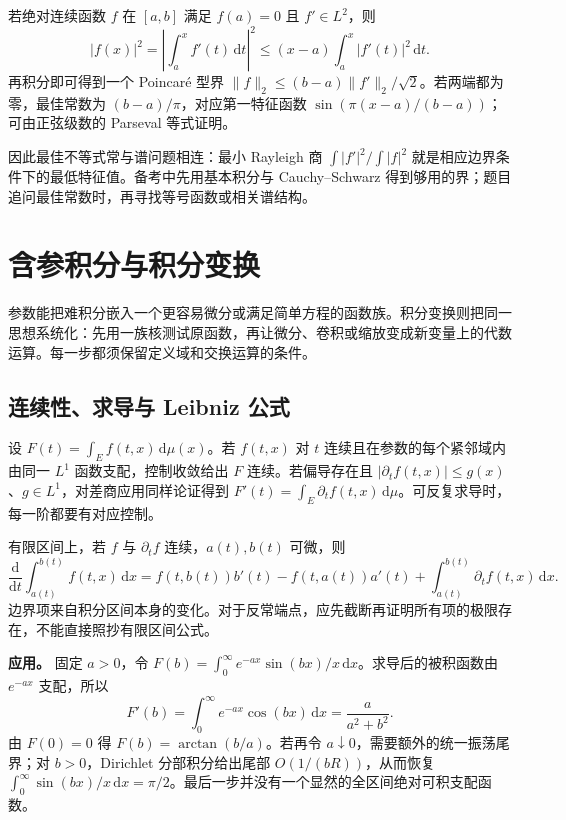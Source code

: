 \documentclass[12pt,fontset=fandol]{ctexart}
\begin{document}
若绝对连续函数 $f$ 在 $[a,b]$ 满足 $f(a)=0$ 且 $f'\in L^2$，则
\[
|f(x)|^2=\left|\int_a^xf'(t)\,\mathrm dt\right|^2
\leq(x-a)\int_a^x|f'(t)|^2\,\mathrm dt.
\]
再积分即可得到一个 Poincaré 型界 $\|f\|_2\leq(b-a)\|f'\|_2/\sqrt2$。若两端都为零，最佳常数为 $(b-a)/\pi$，对应第一特征函数 $\sin(\pi(x-a)/(b-a))$；可由正弦级数的 Parseval 等式证明。

因此最佳不等式常与谱问题相连：最小 Rayleigh 商 $\int|f'|^2/\int|f|^2$ 就是相应边界条件下的最低特征值。备考中先用基本积分与 Cauchy--Schwarz 得到够用的界；题目追问最佳常数时，再寻找等号函数或相关谱结构。



\section{含参积分与积分变换}

参数能把难积分嵌入一个更容易微分或满足简单方程的函数族。积分变换则把同一思想系统化：先用一族核测试原函数，再让微分、卷积或缩放变成新变量上的代数运算。每一步都须保留定义域和交换运算的条件。

\subsection{连续性、求导与 Leibniz 公式}

\label{app:transform-parameter}

设 $F(t)=\int_Ef(t,x)\,\mathrm d\mu(x)$。若 $f(t,x)$ 对 $t$ 连续且在参数的每个紧邻域内由同一 $L^1$ 函数支配，控制收敛给出 $F$ 连续。若偏导存在且 $|\partial_tf(t,x)|\leq g(x)$、$g\in L^1$，对差商应用同样论证得到 $F'(t)=\int_E\partial_tf(t,x)\,\mathrm d\mu$。可反复求导时，每一阶都要有对应控制。

有限区间上，若 $f$ 与 $\partial_tf$ 连续，$a(t),b(t)$ 可微，则
\[
\frac{\mathrm d}{\mathrm dt}\int_{a(t)}^{b(t)}f(t,x)\,\mathrm dx
=f(t,b(t))b'(t)-f(t,a(t))a'(t)+\int_{a(t)}^{b(t)}\partial_tf(t,x)\,\mathrm dx.
\]
边界项来自积分区间本身的变化。对于反常端点，应先截断再证明所有项的极限存在，不能直接照抄有限区间公式。

\textbf{应用。} 固定 $a>0$，令 $F(b)=\int_0^\infty e^{-ax}\sin(bx)/x\,\mathrm dx$。求导后的被积函数由 $e^{-ax}$ 支配，所以
\[
F'(b)=\int_0^\infty e^{-ax}\cos(bx)\,\mathrm dx=\frac a{a^2+b^2}.
\]
由 $F(0)=0$ 得 $F(b)=\arctan(b/a)$。若再令 $a\downarrow0$，需要额外的统一振荡尾界；对 $b>0$，Dirichlet 分部积分给出尾部 $O(1/(bR))$，从而恢复 $\int_0^\infty\sin(bx)/x\,\mathrm dx=\pi/2$。最后一步并没有一个显然的全区间绝对可积支配函数。
\end{document}
